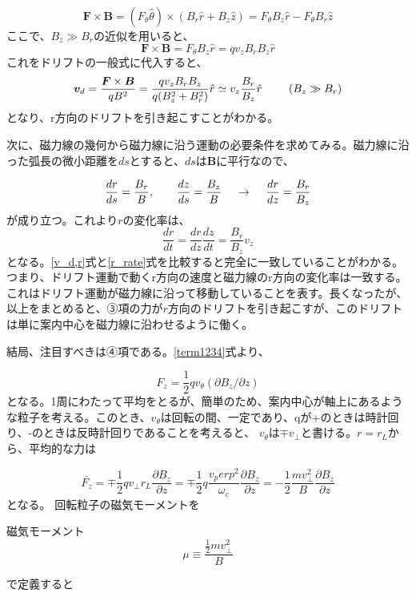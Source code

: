 \documentclass{ltjsarticle}
\numberwithin{equation}{section} %
\begin{document}
\[
  \bm{F} \times \bm{B} = (F_\theta \hat{\theta}) \times (B_r \hat{r}+B_z \hat{z}) = F_\theta B_z \hat{r} - F_\theta B_r \hat{z}
\]
ここで、$B_z \gg B_r$の近似を用いると、
\[
 \bm{F} \times \bm{B} = F_\theta B_z \hat{r} = qv_zB_rB_z\hat{r}
\]
これをドリフトの一般式に代入すると、
\begin{equation}
  \bm{v}_{d} = \frac{\bm{F} \times \bm{B}}{qB^2} = \frac{qv_zB_rB_z}{q(B_z^2+B_r^2)}\hat{r} \simeq v_z \frac{B_r}{B_z}\hat{r} \hspace{2pc} (B_z \gg B_r) \label{v_d,r}
\end{equation}
となり、r方向のドリフトを引き起こすことがわかる。

次に、磁力線の幾何から磁力線に沿う運動の必要条件を求めてみる。磁力線に沿った弧長の微小距離を$ds$とすると、$ds$は$\bm{B}$に平行なので、

\[
 \frac{dr}{ds} = \frac{B_r}{B}, \qquad \frac{dz}{ds} = \frac{B_z}{B} \hspace{1pc} \to \hspace{1pc} \frac{dr}{dz} = \frac{B_r}{B_z} 
\]
が成り立つ。これより$r$の変化率は、
\begin{equation}
  \frac{dr}{dt} = \frac{dr}{dz}\frac{dz}{dt} = \frac{B_r}{B_z}v_z \label{r_rate}
\end{equation}
となる。\eqref{v_d,r}式と\eqref{r_rate}式を比較すると完全に一致していることがわかる。つまり、ドリフト運動で動くr方向の速度と磁力線のr方向の変化率は一致する。
これはドリフト運動が磁力線に沿って移動していることを表す。長くなったが、以上をまとめると、➂項の力が$r$方向のドリフトを引き起こすが、このドリフトは単に案内中心を磁力線に沿わせるように働く。

結局、注目すべきは➃項である。\eqref{term1234}式より、

\begin{equation}
  F_z = \frac{1}{2}qv_\theta (\partial B_z/\partial z)
\end{equation}
となる。1周にわたって平均をとるが、簡単のため、案内中心が軸上にあるような粒子を考える。このとき、$v_\theta$は回転の間、一定であり、qが+のときは時計回り、-のときは反時計回りであることを考えると、
$v_\theta$は$\mp v_\perp$と書ける。$r=r_L$から、平均的な力は

\begin{equation}
  \bar{F_z} = \mp \frac{1}{2}qv_\perp r_L\frac{\partial B_z}{\partial z} = \mp \frac{1}{2}q\frac{v_perp ^2}{\omega_c}\frac{\partial B_z}{\partial z} = -\frac{1}{2}\frac{mv_\perp ^2}{B}\frac{\partial B_z}{\partial z}
\end{equation}
となる。
回転粒子の磁気モーメントを
\begin{eqbox}{磁気モーメント}
\begin{equation}
 \mu \equiv \dfrac{\frac{1}{2}mv_\perp ^2 }{B}  \label{df.mag_moment}
\end{equation}
\end{eqbox}
で定義すると
\end{document}
